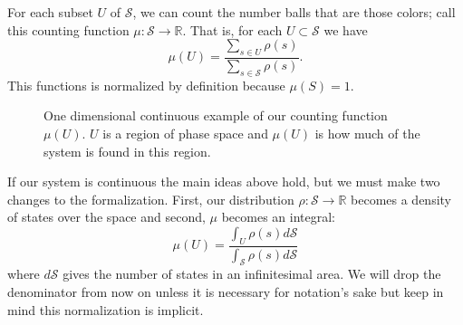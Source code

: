 \documentclass{article}[a4paper]
\begin{document}
	For each subset $U$ of $\mathcal{S}$, we can count the number balls that are those colors; call this counting function $\mu : \mathcal{S} \to \mathbb{R}$. That is, for each $U \subset \mathcal{S}$ we have $$\mu(U) = \frac{\sum_{s \in U} \rho(s)}{\sum_{s \in \mathcal{S}} \rho(s)}.$$ This functions is normalized by definition because $\mu(S) = 1$.
	

\begin{figure}
\begin{center}
\end{center}
\caption{One dimensional continuous example of our counting function $\mu(U)$. $U$ is a region of phase space and $\mu(U)$ is how much of the system is found in this region.}
\end{figure}

	
	
	If our system is continuous the main ideas above hold, but we must make two changes to the formalization. First, our distribution $\rho : \mathcal{S} \to \mathbb{R}$ becomes a density of states over the space and second, $\mu$ becomes an integral: $$\mu(U) = \frac{\int_{U} \rho(s) d\mathcal{S}}{\int_{\mathcal{S}} \rho(s) d\mathcal{S}}$$ where $d\mathcal{S}$ gives the number of states in an infinitesimal area. We will drop the denominator from now on unless it is necessary for notation's sake but keep in mind this normalization is implicit.
	
\end{document}

